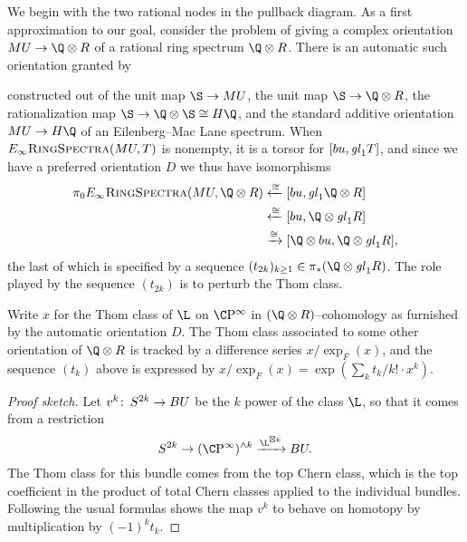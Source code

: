 We begin with the two rational nodes in the pullback diagram.  As a first approximation to our goal, consider the problem of giving a complex orientation \(MU \to \Q \otimes R\) of a rational ring spectrum \(\Q \otimes R\).  There is an automatic such orientation granted by
\begin{center}
\end{center}
constructed out of the unit map \(\S \to MU\), the unit map \(\S \to \Q \otimes R\), the rationalization map \(\S \to \Q \otimes \S \cong H\Q\), and the standard additive orientation \(MU \to H\Q\) of an Eilenberg--Mac Lane spectrum.  When \(E_\infty\normalfont\textsc{RingSpectra}(MU, T)\) is nonempty, it is a torsor for \([bu, \mathit{gl}_1 T]\), and since we have a preferred orientation \(D\) we thus have isomorphisms
\begin{align*}
\pi_0 \EinftyRings(MU, \Q \otimes R) & \xleftarrow{\cong} [bu, \gl_1 \Q \otimes R] \\
& \xleftarrow{\cong} [bu, \Q \otimes \gl_1 R] \\
&\xrightarrow{\cong} [\Q \otimes bu, \Q \otimes \gl_1 R],
\end{align*}
the last of which is specified by a sequence \((t_{2k})_{k \ge 1} \in \pi_* (\Q \otimes \gl_1 R)\).  The role played by the sequence \((t_{2k})\) is to perturb the Thom class.

\begin{lemma}
Write \(x\) for the Thom class of \(\L\) on \(\CP^\infty\) in \((\Q \otimes R)\)--cohomology as furnished by the automatic orientation \(D\).  The Thom class associated to some other orientation of \(\Q \otimes R\) is tracked by a difference series \(x / \exp_F(x)\), and the sequence \((t_k)\) above is expressed by \(x / \exp_F(x) = \exp(\sum_k t_k/k! \cdot x^k)\).
\end{lemma}
\begin{proof}[Proof sketch]
Let \(v^k\colon\thinspace S^{2k} \to BU\) be the \(k\){\th} power of the class \(\L\), so that it comes from a restriction \[S^{2k} \to (\CP^\infty)^{\sm k} \xrightarrow{\L^{\boxtimes k}} BU.\]  The Thom class for this bundle comes from the top Chern class, which is the top coefficient in the product of total Chern classes applied to the individual bundles.  Following the usual formulas shows the map \(v^k\) to behave on homotopy by multiplication by \((-1)^k t_k\).
\end{proof}

